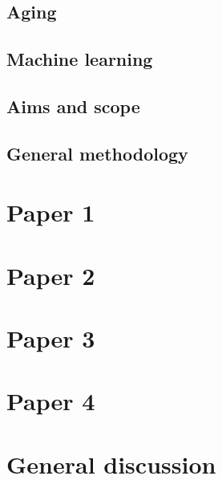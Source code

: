 \documentclass{book}
\begin{document}
    \section{Aging}
    \label{sec:theory:aging}
        
    
    \section{Machine learning}
    \label{sec:theory:ml}
     
    
    \section{Aims and scope}
    \label{sec:aims_scope}
    

    \section{General methodology}
    \label{sec:methods}
    


\chapter{Paper 1}
\label{chap:paper1}

\chapter{Paper 2}
\label{chap:paper2}

\chapter{Paper 3}
\label{chap:paper3}

\chapter{Paper 4}
\label{chap:paper4}

\chapter{General discussion}
\label{chap:discussion}

\printbibliography
\end{document}
